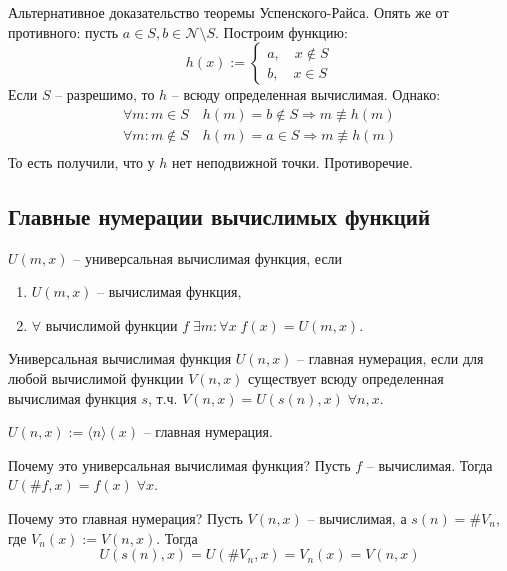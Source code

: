 \begin{example}
    Альтернативное доказательство теоремы Успенского-Райса. Опять же от противного: пусть $a \in S, b \in \mathcal{N} \setminus S$. Построим функцию: \[ h(x) := \begin{cases}
        a, \quad x \notin S \\
        b, \quad x \in S
    \end{cases} \]
    Если $S$ -- разрешимо, то $h$ -- всюду определенная вычислимая. Однако: \begin{gather*}
        \forall m : m \in S \quad h(m) = b \notin S \Rightarrow m \not\equiv h(m) \\
        \forall m : m \notin S \quad h(m) = a \in S \Rightarrow m \not\equiv h(m) \\
    \end{gather*}
    То есть получили, что у $h$ нет неподвижной точки. Противоречие.
\end{example}

\subsection{Главные нумерации вычислимых функций}
\begin{conj}
    $U(m, x)$ -- универсальная вычислимая функция, если \begin{enumerate}
        \item $U(m, x)$ -- вычислимая функция,
        \item $\forall$ вычислимой функции $f \;\exists m : \forall x \; f(x) = U(m, x)$.  
    \end{enumerate}
\end{conj}
\begin{conj}
    Универсальная вычислимая функция $U(n, x)$ -- главная нумерация, если для любой вычислимой функции $V(n, x)$ существует всюду определенная вычислимая функция $s$, т.ч. $V(n, x) = U(s(n), x) \; \forall n, x$.   
\end{conj}

\begin{example}
    $U(n, x) := \langle n \rangle (x)$ -- главная нумерация.

    Почему это универсальная вычислимая функция? Пусть $f$ -- вычислимая. Тогда $U(\#f, x) = f(x) \; \forall x$.

    Почему это главная нумерация? Пусть $V(n, x)$ -- вычислимая, а $s(n) = \#V_n$, где $V_n(x) := V(n, x)$. Тогда \[ U(s(n), x) = U(\#V_n, x) = V_n(x) = V(n, x) \] 
\end{example}

